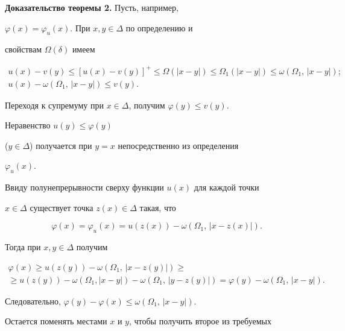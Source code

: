 {\bf Доказательство теоремы 2.} Пусть, например,


$\varphi(x)=\varphi_u(x)$. При $x,y\in\Delta$ по определению и


свойствам $\Omega(\delta)$ имеем


\begin{gather*}


u(x)-v(y)\le[u(x)-v(y)]^+\le \Omega(|x-y|)\le


\Omega_1(|x-y|)\le \omega(\Omega_1,\,|x-y|);\\


%


u(x)-\omega(\Omega_1,\,|x-y|)\le v(y).


\end{gather*}





Переходя к супремуму при $x\in\Delta$, получим $\varphi(y)\le v(y)$.


Неравенство $u(y)\le\varphi(y)$


($y\in\Delta$) получается при $y=x$ непосредственно из определения


$\varphi_u(x)$.





Ввиду полунепрерывности сверху функции $u(x)$ для каждой точки


$x\in\Delta$ существует точка $z(x)\in\Delta$ такая, что


$$


\varphi(x)=\varphi_u(x)=u(z(x))-\omega


(\Omega_1,\,|x-z(x)|).


$$


Тогда при $x,y\in\Delta$ получим


\begin{multline*}


\varphi(x)\ge u(z(y))-\omega(\Omega_1,\,|x-z(y)|)\ge \\


\ge u(z(y))-\omega(\Omega_1,|x-y|)-


\omega(\Omega_1,\,|y-z(y)|)= \varphi(y)-


\omega(\Omega_1,\,|x-y|).


\end{multline*}


Следовательно, $\varphi(y)-\varphi(x)\le\omega(\Omega_1,\,|x-y|)$.


Остается поменять местами $x$ и $y$, чтобы получить второе из требуемых



